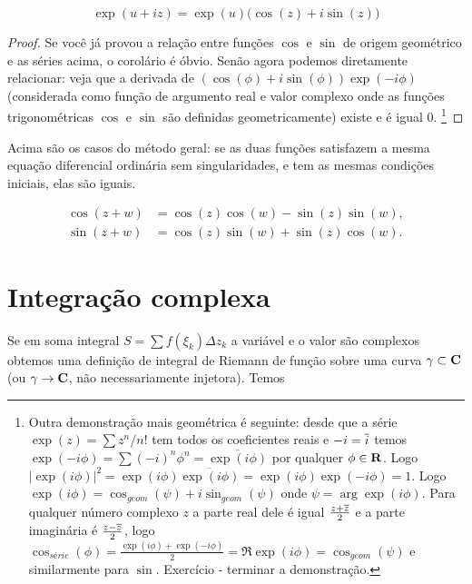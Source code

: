 \begin{cor}
\begin{equation}
\exp(u+iz) = \exp(u) \big( \cos(z) + i \sin(z) \big)
\end{equation}
\end{cor}
\begin{proof}
Se você já provou a relação entre funções $\cos$ e $\sin$ de origem geométrico e as séries acima,
o corolário é óbvio. Senão agora podemos diretamente relacionar: veja que a derivada de
$(\cos(\phi) + i \sin(\phi)) \exp(-i\phi)$ (considerada como função de argumento real e valor complexo
onde as funções trigonométricas $\cos$ e $\sin$ são definidas geometricamente)
existe e é igual $0$.
\footnote{
Outra demonstração mais geométrica é seguinte:
desde que a série $\exp(z) = \sum z^n / n!$ tem todos os coeficientes reais e $-i = \overline{i}$ temos
$\exp(-i\phi) = \sum (-i)^n \phi^n = \overline{\exp(i\phi)}$ por qualquer $\phi \in \mathbf{R}$.
Logo $|\exp(i\phi)|^2 = \exp(i\phi) \overline{\exp(i\phi)} = \exp(i\phi) \exp(-i\phi) = 1$.
Logo $\exp(i\phi) = \cos_{geom}(\psi) + i \sin_{geom}(\psi)$ onde $\psi = \arg \exp(i\phi)$.
Para qualquer número complexo $z$ a parte real dele é igual $\frac{z+\overline{z}}2$
e a parte imaginária é $\frac{z-\overline{z}}2$, logo $\cos_{série}(\phi) = \frac{\exp(i\phi)+\exp(-i\phi)}2 = \Re \exp(i\phi) = \cos_{geom}(\psi)$ e similarmente para $\sin$.
Exercício - terminar a demonstração.
}
\end{proof}

\begin{remark}
Acima são os casos do método geral:
se as duas funções satisfazem a mesma equação diferencial ordinária sem singularidades,
e tem as mesmas condições iniciais, elas são iguais.
\end{remark}

\begin{cor}
\begin{align*}
\cos(z+w) &= \cos(z)\cos(w) - \sin(z)\sin(w), \\
\sin(z+w) &= \cos(z)\sin(w) + \sin(z)\cos(w). 
\end{align*}
\end{cor}



\section{Integração complexa}

Se em soma integral $S = \sum f(\xi_k) \Delta z_k$ a variável e o valor são complexos
obtemos uma definição de integral de Riemann de função sobre uma curva $\gamma \subset \mathbf{C}$
(ou $\gamma \to \mathbf{C}$, não necessariamente injetora). Temos

